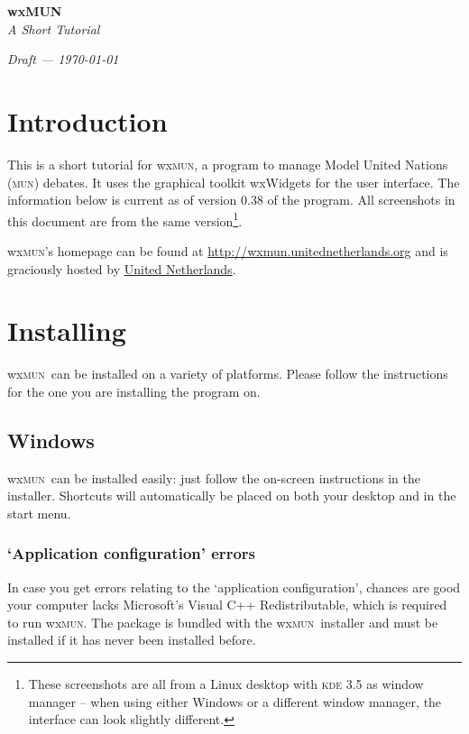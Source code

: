\documentclass[11pt, a4paper]{article}
\newcommand\wxMUN{wx\textsc{mun}}
\begin{document}

\thispagestyle{empty}

\vspace*{\fill}
\vspace*{\fill}
\begin{center}
\textbf{\huge{wxMUN}}\\[1em]
\emph{\large{A Short Tutorial}}
\end{center}
\vspace*{\fill}
\vspace*{\fill}
\vspace*{\fill}
\vspace*{\fill}
\vspace*{\fill}
\hfill \emph{Draft --- \today}

\newpage
{} 
\setcounter{page}{1}

\section*{Introduction}
This is a short tutorial for \wxMUN , a program to manage Model United Nations (\textsc{mun}) debates. It uses the graphical toolkit wxWidgets for the user interface. The information below is current as of version 0.38 of the program. All screenshots in this document are from the same version\footnote{These screenshots are all from a Linux desktop with \textsc{kde} 3.5 as window manager -- when using either Windows or a different window manager, the interface can look slightly different.}.

\wxMUN 's homepage can be found at \url{http://wxmun.unitednetherlands.org} and is graciously hosted by \href{http://www.unitednetherlands.org}{United Netherlands}.

\section{Installing}
\wxMUN\ can be installed on a variety of platforms. Please follow the instructions for the one you are installing the program on.

\subsection{Windows}
\wxMUN\ can be installed easily: just follow the on-screen instructions in the installer. Shortcuts will automatically be placed on both your desktop and in the start menu.
\subsubsection{`Application configuration' errors}
In case you get errors relating to the `application configuration', chances are good your computer lacks Microsoft's Visual C++ Redistributable, which is required to run \wxMUN . The package is bundled with the \wxMUN\ installer and must be installed if it has never been installed before.
\end{document}
